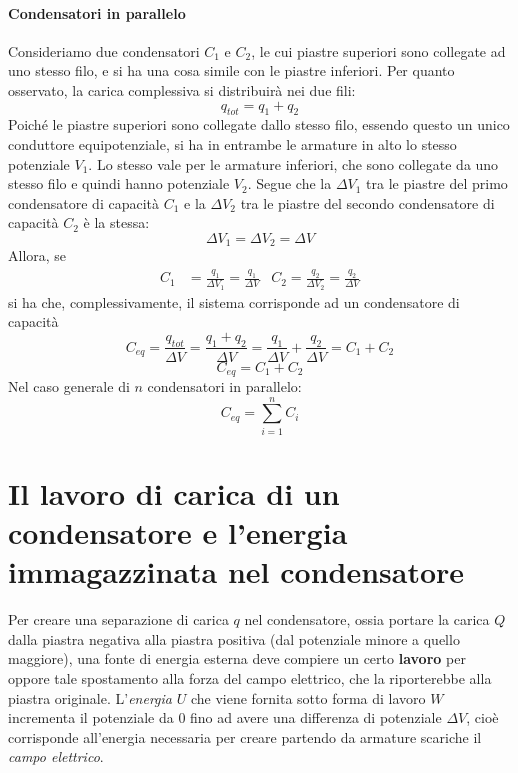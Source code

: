 \paragraph{Condensatori in parallelo}
Consideriamo due condensatori $C_1$ e $C_2$, le cui piastre superiori sono collegate ad uno stesso filo, e si ha una cosa simile con le piastre inferiori.
Per quanto osservato, la carica complessiva si distribuirà nei due fili:
\begin{equation*}
	q_{tot}=q_1+q_2
\end{equation*}
Poiché le piastre superiori sono collegate dallo stesso filo, essendo questo un unico conduttore equipotenziale, si ha in entrambe le armature in alto lo stesso potenziale $V_1$. Lo stesso vale per le armature inferiori, che sono collegate da uno stesso filo e quindi hanno potenziale $V_2$. Segue che la \ddp $\Delta V_1$ tra le piastre del primo condensatore di capacità $C_1$ e la \ddp $\Delta V_2$ tra le piastre del secondo condensatore di capacità $C_2$ è la stessa:
\begin{equation*}
	\Delta V_1=\Delta V_2=\Delta V
\end{equation*}
Allora, se
\begin{align*}
	C_1&=\frac{q_1}{\Delta V_1}=\frac{q_1}{\Delta V} & C_2=\frac{q_2}{\Delta V_2}=\frac{q_2}{\Delta V}
\end{align*}
si ha che, complessivamente, il sistema corrisponde ad un condensatore di capacità
\begin{equation*}
	C_{eq}=\frac{q_{tot}}{\Delta V}=\frac{q_1+q_2}{\Delta V}=\frac{q_1}{\Delta V}+\frac{q_2}{\Delta V}=C_1+C_2
\end{equation*}
\begin{equation}
	C_{eq}=C_1+C_2
\end{equation}
Nel caso generale di $n$ condensatori in parallelo:
\begin{equation}
	C_{eq}=\sum_{i=1}^{n}C_i
\end{equation}
\section{Il lavoro di carica di un condensatore e l'energia immagazzinata nel condensatore} %
Per creare una separazione di carica $q$ nel condensatore, ossia portare la carica $Q$ dalla piastra negativa alla piastra positiva (dal potenziale minore a quello maggiore), una fonte di energia esterna deve compiere un certo \textbf{lavoro} per oppore tale spostamento alla forza del campo elettrico, che la riporterebbe alla piastra originale. L'\textit{energia} $U$ che viene fornita sotto forma di lavoro $W$ incrementa il potenziale da $0$ fino ad avere una differenza di potenziale $\Delta V$, cioè corrisponde all'energia necessaria per creare partendo da armature scariche il \textit{campo elettrico}.

